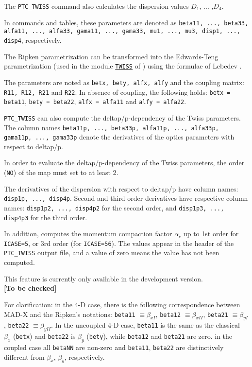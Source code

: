 The {\tt PTC\_TWISS} command also calculates the dispersion values
$D_1$, ... ,$D_4$.

In \madx commands and tables, these parameters are denoted as
\texttt{beta11, ..., beta33, alfa11, ..., alfa33, gama11, ..., gama33,
  mu1, ..., mu3, disp1, ..., disp4}, respectively.

The Ripken parametrization can be transformed into the Edwards-Teng
parametrization (used in the module \hyperref[chap:twiss]{\tt TWISS} of
\madx) using the formulae of Lebedev \cite{lebedev2010}.

The parameters are noted as {\tt betx, bety, alfx, alfy} and the
coupling matrix: {\tt R11, R12, R21} and {\tt R22}. In absence of
coupling, the following holds: {\tt betx = beta11}, {\tt bety = beta22},
{\tt alfx = alfa11} and {\tt alfy = alfa22}.

{\tt PTC\_TWISS} can also compute the deltap/p-dependency of the Twiss
parameters. The column names {\tt beta11p, ..., beta33p,
  alfa11p, ..., alfa33p, gama11p, ..., gama33p} denote the derivatives of
the optics parameters with respect to deltap/p. 

In order to evaluate the deltap/p-dependency of the Twiss parameters,
the order ({\tt NO}) of the map must set to at least 2.  

The derivatives of the dispersion with respect to deltap/p have column
names: {\tt disp1p, ..., disp4p}. 
Second and third order derivatives have respective column names:  
\texttt{disp1p2, ..., disp4p2} for the second order, and 
\texttt{disp1p3, ..., disp4p3} for the third order.

In addition, \ptc computes the momentum compaction factor $\alpha_c$ up to
1st order for {\tt ICASE=5}, or 3rd order (for {\tt ICASE=56}). The
values appear in the header of the {\tt PTC\_TWISS} output file, and a
value of zero means the value has not been computed.

This feature is currently only available in the development
version. \\
{\bf [To be checked]}

For clarification: in the 4-D case, there is the following
correspondence between MAD-X and the Ripken's notations:  
{\tt beta11} $\equiv \beta_{xI}$, 
{\tt beta12} $\equiv \beta_{xII}$, 
{\tt beta21} $\equiv \beta_{yI}$, 
{\tt beta22} $\equiv \beta_{yII}$.
In the uncoupled 4-D case, {\tt beta11} is the same as the
classical $\beta_x$ ({\tt betx}) and {\tt beta22} is $\beta_y$ 
({\tt bety}), while {\tt beta12} and {\tt beta21} are zero.  
in the coupled case all {\tt betaNN} are non-zero and {\tt beta11},
{\tt beta22} are distinctively different from $\beta_x$, $\beta_y$,
respectively.

